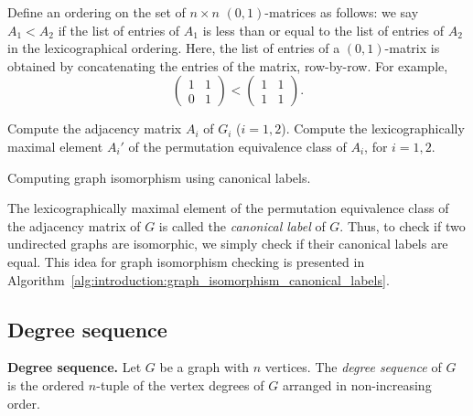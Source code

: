 Define an ordering on the set of $n \times n$ $(0, 1)$-matrices as
follows: we say $A_1 < A_2$ if the list of entries of $A_1$ is less
than or equal to the list of entries of $A_2$ in the lexicographical
ordering. Here, the list of entries of a $(0, 1)$-matrix is obtained
by concatenating the entries of the matrix, row-by-row. For example,
\[
\begin{pmatrix}
1 & 1 \\
0 & 1
\end{pmatrix}
<
\begin{pmatrix}
1 & 1 \\
1 & 1
\end{pmatrix}.
\]

\begin{algorithm}[!htpb]
\SetLine
\dontprintsemicolon  %
\BlankLine
Compute the adjacency matrix $A_i$ of $G_i$ ($i = 1, 2$).\;
Compute the lexicographically maximal element $A_i'$ of the
permutation equivalence class of $A_i$, for $i = 1, 2$.\;
\caption{Computing graph isomorphism using canonical labels.}
\label{alg:introduction:graph_isomorphism_canonical_labels}
\end{algorithm}

The lexicographically maximal element of the permutation equivalence
class of the adjacency matrix of $G$ is called the
\emph{canonical label} of $G$. Thus, to check if two undirected graphs
are isomorphic, we simply check if their canonical labels are equal.
 This idea for graph isomorphism checking
is presented in
Algorithm~\ref{alg:introduction:graph_isomorphism_canonical_labels}.



\subsection{Degree sequence}

\begin{definition}
\textbf{Degree sequence.}
Let $G$ be a graph with $n$ vertices. The \emph{degree sequence} of
$G$ is the ordered $n$-tuple of the vertex degrees of $G$ arranged in
non-increasing order.
\end{definition}

